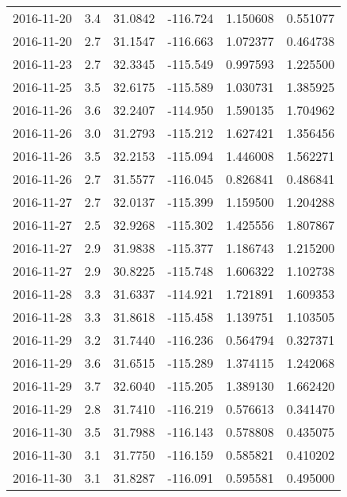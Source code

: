 \begin{tabular}{lrrrrr}
2016-11-20 &       3.4 &  31.0842 &  -116.724 &         1.150608 &         0.551077 \\
2016-11-20 &       2.7 &  31.1547 &  -116.663 &         1.072377 &         0.464738 \\
2016-11-23 &       2.7 &  32.3345 &  -115.549 &         0.997593 &         1.225500 \\
2016-11-25 &       3.5 &  32.6175 &  -115.589 &         1.030731 &         1.385925 \\
2016-11-26 &       3.6 &  32.2407 &  -114.950 &         1.590135 &         1.704962 \\
2016-11-26 &       3.0 &  31.2793 &  -115.212 &         1.627421 &         1.356456 \\
2016-11-26 &       3.5 &  32.2153 &  -115.094 &         1.446008 &         1.562271 \\
2016-11-26 &       2.7 &  31.5577 &  -116.045 &         0.826841 &         0.486841 \\
2016-11-27 &       2.7 &  32.0137 &  -115.399 &         1.159500 &         1.204288 \\
2016-11-27 &       2.5 &  32.9268 &  -115.302 &         1.425556 &         1.807867 \\
2016-11-27 &       2.9 &  31.9838 &  -115.377 &         1.186743 &         1.215200 \\
2016-11-27 &       2.9 &  30.8225 &  -115.748 &         1.606322 &         1.102738 \\
2016-11-28 &       3.3 &  31.6337 &  -114.921 &         1.721891 &         1.609353 \\
2016-11-28 &       3.3 &  31.8618 &  -115.458 &         1.139751 &         1.103505 \\
2016-11-29 &       3.2 &  31.7440 &  -116.236 &         0.564794 &         0.327371 \\
2016-11-29 &       3.6 &  31.6515 &  -115.289 &         1.374115 &         1.242068 \\
2016-11-29 &       3.7 &  32.6040 &  -115.205 &         1.389130 &         1.662420 \\
2016-11-29 &       2.8 &  31.7410 &  -116.219 &         0.576613 &         0.341470 \\
2016-11-30 &       3.5 &  31.7988 &  -116.143 &         0.578808 &         0.435075 \\
2016-11-30 &       3.1 &  31.7750 &  -116.159 &         0.585821 &         0.410202 \\
2016-11-30 &       3.1 &  31.8287 &  -116.091 &         0.595581 &         0.495000 \\

\end{tabular}
